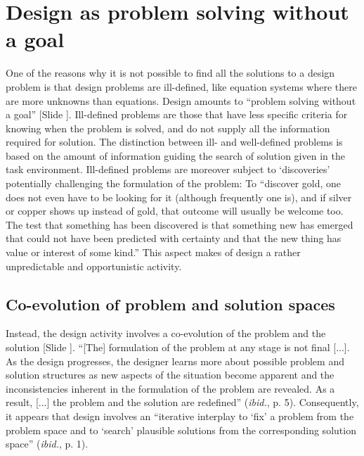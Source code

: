 \documentclass{article}
\newcounter{slide}
\begin{document}
\section{Design as problem solving without a goal}
\label{sec:illdefined}
One of the reasons why it is not possible to find all the solutions to a design problem is that design problems are ill-defined, like equation systems where there are more unknowns than equations. Design amounts to ``problem solving without a goal'' \cite[p. 106]{simon1996sciences} {\color{blue}[Slide ]}. Ill-defined problems are those that have less specific criteria for knowing when the problem is solved, and do not supply all the information required for solution. The distinction between ill- and well-defined problems is based on the amount of information guiding the search of solution given in the task environment. Ill-defined problems are moreover subject to `discoveries' potentially challenging the formulation of the problem: To ``discover gold, one does not even have to be looking for it (although frequently one is), and if silver or copper shows up instead of gold, that outcome will usually be welcome too. The test that something has been discovered is that something new has emerged that could not have been predicted with certainty and that the new thing has value or interest of some kind.'' This aspect makes of design a rather unpredictable and opportunistic activity.

\subsection{Co-evolution of problem and solution spaces}
\label{sec:coevolution}

Instead, the design activity involves a co-evolution of the problem and the solution \cite{maherFormalisingDesignExploration1996} {\color{blue}[Slide ]}. ``[The] formulation of the problem at any stage is not final [...]. As the design progresses, the designer learns more about possible problem and solution structures as new aspects of the situation become apparent and the inconsistencies inherent in the formulation of the problem are revealed. As a result, [...] the problem and the solution are redefined'' (\emph{ibid.}, p. 5). Consequently, it appears that design involves an ``iterative interplay to `fix' a problem from the problem space and to `search' plausible solutions from the corresponding solution space'' (\emph{ibid.}, p. 1).
\end{document}
